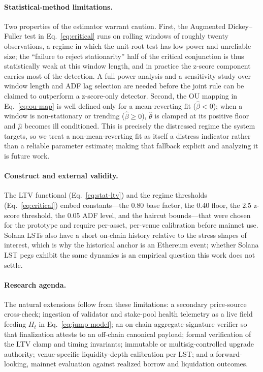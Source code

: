 \documentclass[aps,prx,reprint,nofootinbib,longbibliography]{revtex4-2}
\begin{document}
\paragraph{Statistical-method limitations.}
Two properties of the estimator warrant caution. First, the Augmented Dickey--Fuller
test in Eq.~\eqref{eq:critical} runs on rolling windows of roughly twenty
observations, a regime in which the unit-root test has low power and unreliable
size; the ``failure to reject stationarity'' half of the critical conjunction is
thus statistically weak at this window length, and in practice the z-score component
carries most of the detection. A full power analysis and a sensitivity study over
window length and ADF lag selection are needed before the joint rule can be claimed
to outperform a z-score-only detector. Second, the OU mapping in
Eq.~\eqref{eq:ou-map} is well defined only for a mean-reverting fit
($\hat{\beta}<0$); when a window is non-stationary or trending ($\hat{\beta}\geq 0$),
$\hat{\theta}$ is clamped at its positive floor and $\hat{\mu}$ becomes ill
conditioned. This is precisely the distressed regime the system targets, so we treat
a non-mean-reverting fit as itself a distress indicator rather than a reliable
parameter estimate; making that fallback explicit and analyzing it is future work.

\paragraph{Construct and external validity.}
The LTV functional (Eq.~\eqref{eq:stat-ltv}) and the regime thresholds
(Eq.~\eqref{eq:critical}) embed constants---the $0.80$ base factor, the $0.40$
floor, the $2.5$ z-score threshold, the $0.05$ ADF level, and the haircut
bounds---that were chosen for the prototype and require per-asset, per-venue
calibration before mainnet use. Solana LSTs also have a short on-chain history
relative to the stress shapes of interest, which is why the historical anchor is an
Ethereum event; whether Solana LST pegs exhibit the same dynamics is an empirical
question this work does not settle.

\paragraph{Research agenda.}
The natural extensions follow from these limitations: a secondary price-source
cross-check; ingestion of validator and stake-pool health telemetry as a live field
feeding $H_t$ in Eq.~\eqref{eq:jump-model}; an on-chain aggregate-signature verifier
so that finalization attests to an off-chain canonical payload; formal verification
of the LTV clamp and timing invariants; immutable or multisig-controlled upgrade
authority; venue-specific liquidity-depth calibration per LST; and a
forward-looking, mainnet evaluation against realized borrow and liquidation
outcomes.
\end{document}

